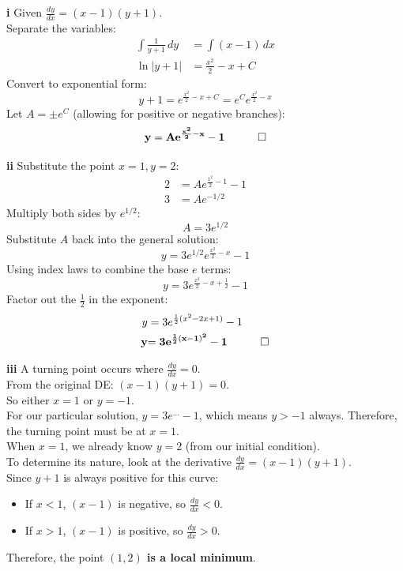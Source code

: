 \begin{solution}
\textbf{i} Given $\frac{dy}{dx} = (x-1)(y+1)$. \\
Separate the variables:
\begin{align*}
    \int \frac{1}{y+1} \, dy &= \int (x-1) \, dx \\
    \ln|y+1| &= \frac{x^2}{2} - x + C
\end{align*}
Convert to exponential form:
\[ y+1 = e^{\frac{x^2}{2} - x + C} = e^C e^{\frac{x^2}{2} - x} \]
Let $A = \pm e^C$ (allowing for positive or negative branches):
\[ \mathbf{y = A e^{\frac{x^2}{2} - x} - 1 \quad \qed} \]

\vspace{0.3cm}
\textbf{ii} Substitute the point $x=1, y=2$:
\begin{align*}
    2 &= A e^{\frac{1^2}{2} - 1} - 1 \\
    3 &= A e^{-1/2}
\end{align*}
Multiply both sides by $e^{1/2}$:
\[ A = 3e^{1/2} \]
Substitute $A$ back into the general solution:
\[ y = 3e^{1/2} e^{\frac{x^2}{2} - x} - 1 \]
Using index laws to combine the base $e$ terms:
\[ y = 3e^{\frac{x^2}{2} - x + \frac{1}{2}} - 1 \]
Factor out the $\frac{1}{2}$ in the exponent:
\begin{align*}
    y &= 3e^{\frac{1}{2}(x^2 - 2x + 1)} - 1 \\
    \mathbf{y} &\mathbf{= 3e^{\frac{1}{2}(x-1)^2} - 1 \quad \qed}
\end{align*}

\vspace{0.3cm}
\textbf{iii} A turning point occurs where $\frac{dy}{dx} = 0$. \\
From the original DE: $(x-1)(y+1) = 0$. \\
So either $x = 1$ or $y = -1$. \\
For our particular solution, $y = 3e^{\dots} - 1$, which means $y > -1$ always. Therefore, the turning point must be at $x = 1$. \\
When $x=1$, we already know $y=2$ (from our initial condition). \\
To determine its nature, look at the derivative $\frac{dy}{dx} = (x-1)(y+1)$. \\
Since $y+1$ is always positive for this curve:
\begin{itemize}
    \item If $x < 1$, $(x-1)$ is negative, so $\frac{dy}{dx} < 0$.
    \item If $x > 1$, $(x-1)$ is positive, so $\frac{dy}{dx} > 0$.
\end{itemize}
Therefore, the point \textbf{$(1, 2)$ is a local minimum}.


\end{solution}
